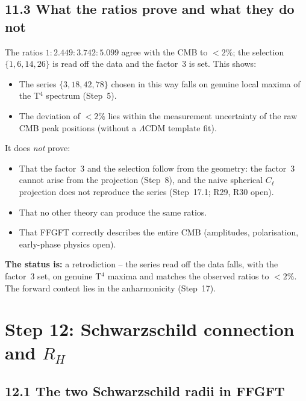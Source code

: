 \subsection*{11.3 What the ratios prove and what they do not}

The ratios $1:2{.}449:3{.}742:5{.}099$ agree with the CMB to
$< 2\%$; the selection $\{1,6,14,26\}$ is read off the data and the
factor~3 is set. This shows:

\begin{itemize}
  \item The series $\{3,18,42,78\}$ chosen in this way falls on genuine
        local maxima of the T$^4$ spectrum (Step~5).
  \item The deviation of $< 2\%$ lies within the measurement
        uncertainty of the raw CMB peak positions
        (without a $\Lambda$CDM template fit).
\end{itemize}

It does \emph{not} prove:

\begin{itemize}
  \item That the factor~3 and the selection follow from the geometry:
        the factor~3 cannot arise from the projection (Step~8), and the
        naive spherical $C_\ell$ projection does not reproduce the series
        (Step~17.1; R29, R30 open).
  \item That no other theory can produce the same ratios.
  \item That FFGFT correctly describes the entire CMB
        (amplitudes, polarisation, early-phase physics open).
\end{itemize}

\textbf{The status is:} a retrodiction -- the series read off the data
falls, with the factor~3 set, on genuine T$^4$ maxima and matches the
observed ratios to $< 2\%$. The forward content lies in the anharmonicity
(Step~17).

\section{Step 12: Schwarzschild connection and $R_H$}

\subsection*{12.1 The two Schwarzschild radii in FFGFT}

